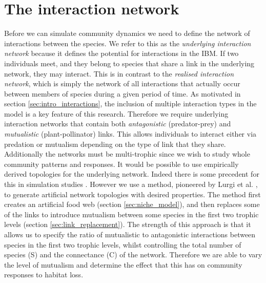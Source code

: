 

\section{The interaction network}
\label{sec:interaction_network}

Before we can simulate community dynamics we need to define the network of interactions between the species. We refer to this as the \emph{underlying interaction network} because it defines the potential for interactions in the IBM. If two individuals meet, and they belong to species that share a link in the underlying network, they may interact. This is in contrast to the \emph{realised interaction network}, which is simply the network of all interactions that actually occur between members of species during a given period of time. As motivated in section \ref{sec:intro_interactions}, the inclusion of multiple interaction types in the model is a key feature of this research. Therefore we require underlying interaction networks that contain both \emph{antagonistic} (predator-prey) and \emph{mutualistic} (plant-pollinator) links. This allows individuals to interact either via predation or mutualism depending on the type of link that they share. Additionally the networks must be multi-trophic since we wish to study whole community patterns and responses. It would be possible to use empirically derived topologies for the underlying network. Indeed there is some precedent for this in simulation studies \cite{fortuna2013habitat}. However we use a method, pioneered by Lurgi et al. \cite{lurgi2015effects}, to generate artificial network topologies with desired properties. The method first creates an artificial food web (section \ref{sec:niche_model}), and then replaces some of the links to introduce mutualism between some species in the first two trophic levels (section \ref{sec:link_replacement}). The strength of this approach is that it allows us to specify the ratio of mutualistic to antagonistic interactions between species in the first two trophic levels, whilst controlling the total number of species (S) and the connectance (C) of the network. Therefore we are able to vary the level of mutualism and determine the effect that this has on community responses to habitat loss. 

